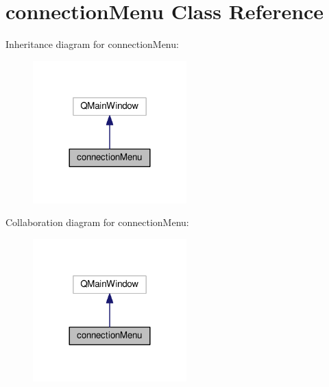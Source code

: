 \hypertarget{classconnectionMenu}{}\section{connection\+Menu Class Reference}
\label{classconnectionMenu}


Inheritance diagram for connection\+Menu\+:\nopagebreak
\begin{figure}[H]
\begin{center}
\leavevmode
\includegraphics[width=168pt]{classconnectionMenu__inherit__graph}
\end{center}
\end{figure}


Collaboration diagram for connection\+Menu\+:\nopagebreak
\begin{figure}[H]
\begin{center}
\leavevmode
\includegraphics[width=168pt]{classconnectionMenu__coll__graph}
\end{center}
\end{figure}
